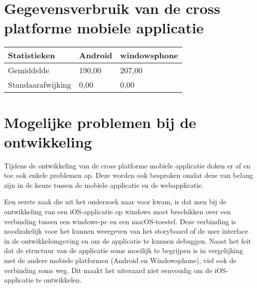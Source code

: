 \section{Gegevensverbruik van de cross platforme mobiele applicatie}

\begin{center}
\begin{tabular}{| l | l | l |}
  \hline
  Statistieken & Android & windowsphone \\ \hline
  Gemiddelde & 190,00 & 207,00 \\ \hline
  Standaarafwijking & 0,00 & 0,00 \\ \hline
\end{tabular}
\end{center}

\section{Mogelijke problemen bij de ontwikkeling}
Tijdens de ontwikkeling van de cross platforme mobiele applicatie doken er af en toe ook enkele problemen op.
Deze worden ook besproken omdat deze van belang zijn in de keuze tussen de mobiele applicatie en de webapplicatie.

Een eerste zaak die uit het onderzoek naar voor kwam, is dat men bij de ontwikkeling van een iOS-applicatie op windows moet beschikken
over een verbinding tussen een windows-pc en een macOS-toestel. Deze verbinding is noodzakelijk voor het kunnen weergeven van
het storyboard of de user interface in de ontwikkelomgeving en om de applicatie te kunnen debuggen. Naast het feit dat de structuur van de applicatie
soms moeilijk te begrijpen is in vergelijking met de andere mobiele platformen (Android en Windowsphone), viel ook de verbinding soms weg.
Dit maakt het uiteraard niet eenvoudig om de iOS-applicatie te ontwikkelen.

